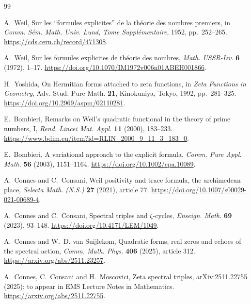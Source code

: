 \documentclass[11pt]{article}
\theoremstyle{remark}
\begin{document}
\begin{thebibliography}{99}

A.~Weil,
\newblock Sur les ``formules explicites'' de la th\'eorie des nombres
premiers,
\newblock in \emph{Comm. S\'em. Math. Univ. Lund, Tome Suppl\'ementaire},
1952, pp.~252--265.
\newblock \url{https://cds.cern.ch/record/471308}.

A.~Weil,
\newblock Sur les formules explicites de th\'eorie des nombres,
\newblock \emph{Math. USSR-Izv.} \textbf{6} (1972), 1--17.
\newblock \url{https://doi.org/10.1070/IM1972v006n01ABEH001866}.

H.~Yoshida,
\newblock On Hermitian forms attached to zeta functions,
\newblock in \emph{Zeta Functions in Geometry}, Adv. Stud. Pure Math.
\textbf{21}, Kinokuniya, Tokyo, 1992, pp.~281--325.
\newblock \url{https://doi.org/10.2969/aspm/02110281}.

E.~Bombieri,
\newblock Remarks on Weil's quadratic functional in the theory of prime
numbers, I,
\newblock \emph{Rend. Lincei Mat. Appl.} \textbf{11} (2000), 183--233.
\newblock \url{https://www.bdim.eu/item?id=RLIN_2000_9_11_3_183_0}.

E.~Bombieri,
\newblock A variational approach to the explicit formula,
\newblock \emph{Comm. Pure Appl. Math.} \textbf{56} (2003), 1151--1164.
\newblock \url{https://doi.org/10.1002/cpa.10089}.

A.~Connes and C.~Consani,
\newblock Weil positivity and trace formula, the archimedean place,
\newblock \emph{Selecta Math. (N.S.)} \textbf{27} (2021), article 77.
\newblock \url{https://doi.org/10.1007/s00029-021-00689-4}.

A.~Connes and C.~Consani,
\newblock Spectral triples and \(\zeta\)-cycles,
\newblock \emph{Enseign. Math.} \textbf{69} (2023), 93--148.
\newblock \url{https://doi.org/10.4171/LEM/1049}.

A.~Connes and W.~D. van Suijlekom,
\newblock Quadratic forms, real zeros and echoes of the spectral action,
\newblock \emph{Comm. Math. Phys.} \textbf{406} (2025), article 312.
\newblock \url{https://arxiv.org/abs/2511.23257}.

A.~Connes, C.~Consani and H.~Moscovici,
\newblock Zeta spectral triples,
\newblock arXiv:2511.22755 (2025); to appear in EMS Lecture Notes in
Mathematics.
\newblock \url{https://arxiv.org/abs/2511.22755}.


\end{thebibliography}
\end{document}
